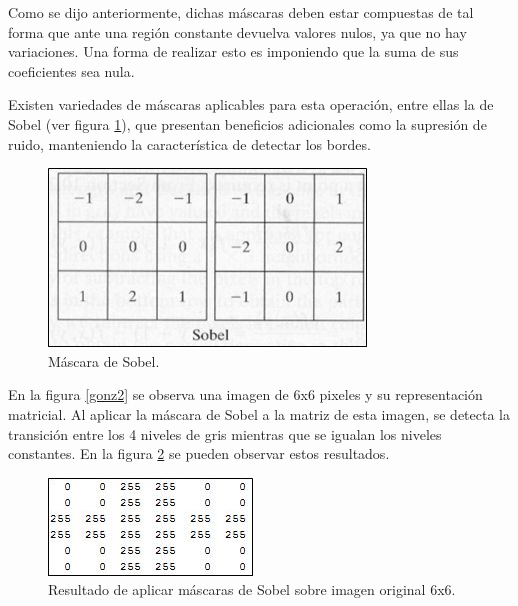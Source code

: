 Como se dijo anteriormente, dichas máscaras deben estar compuestas de tal forma que ante una región constante devuelva valores nulos, ya que no hay variaciones. Una forma de realizar esto es imponiendo que la suma de sus coeficientes sea nula.

Existen variedades de máscaras aplicables para esta operación, entre ellas la de Sobel (ver figura \ref{gonz5}), que presentan beneficios adicionales como la supresión de ruido, manteniendo la característica de detectar los bordes.

\begin{figure}[H]
\begin{center}
\includegraphics[scale=0.8]{img/08_matriz_sobel.jpg}
\end{center}
\caption{Máscara de Sobel.}
\label{gonz5}
\end{figure}

En la figura \ref{gonz2} se observa una imagen de 6x6 pixeles y su representación matricial. Al aplicar la máscara de Sobel a la matriz de esta imagen, se detecta la transición entre los 4 niveles de gris mientras que se igualan los niveles constantes. En la figura \ref{gonz6} se pueden observar estos resultados.

\begin{figure}[H]
\begin{center}
\includegraphics[scale=0.8]{img/09_escala_grises_deteccion_borde.jpg}
\end{center}
\caption{Resultado de aplicar máscaras de Sobel sobre imagen original 6x6.}
\label{gonz6}
\end{figure}

